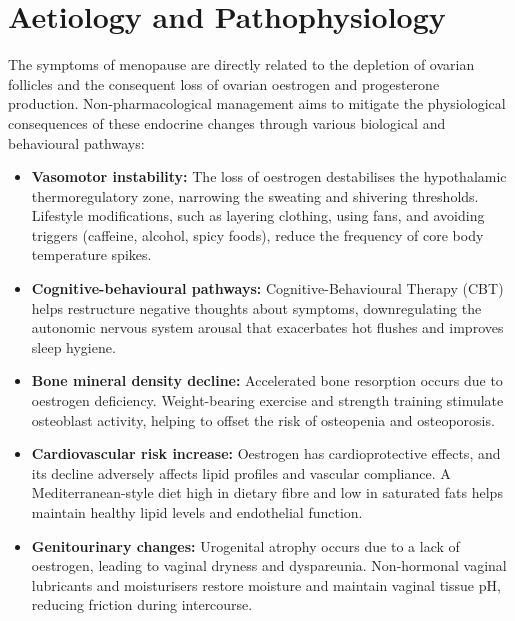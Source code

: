 \section*{Aetiology and Pathophysiology}
The symptoms of menopause are directly related to the depletion of ovarian follicles and the consequent loss of ovarian oestrogen and progesterone production. Non-pharmacological management aims to mitigate the physiological consequences of these endocrine changes through various biological and behavioural pathways:
\begin{itemize}
    \item \textbf{Vasomotor instability:} The loss of oestrogen destabilises the hypothalamic thermoregulatory zone, narrowing the sweating and shivering thresholds. Lifestyle modifications, such as layering clothing, using fans, and avoiding triggers (caffeine, alcohol, spicy foods), reduce the frequency of core body temperature spikes.
    \item \textbf{Cognitive-behavioural pathways:} Cognitive-Behavioural Therapy (CBT) helps restructure negative thoughts about symptoms, downregulating the autonomic nervous system arousal that exacerbates hot flushes and improves sleep hygiene.
    \item \textbf{Bone mineral density decline:} Accelerated bone resorption occurs due to oestrogen deficiency. Weight-bearing exercise and strength training stimulate osteoblast activity, helping to offset the risk of osteopenia and osteoporosis.
    \item \textbf{Cardiovascular risk increase:} Oestrogen has cardioprotective effects, and its decline adversely affects lipid profiles and vascular compliance. A Mediterranean-style diet high in dietary fibre and low in saturated fats helps maintain healthy lipid levels and endothelial function.
    \item \textbf{Genitourinary changes:} Urogenital atrophy occurs due to a lack of oestrogen, leading to vaginal dryness and dyspareunia. Non-hormonal vaginal lubricants and moisturisers restore moisture and maintain vaginal tissue pH, reducing friction during intercourse.
\end{itemize}

